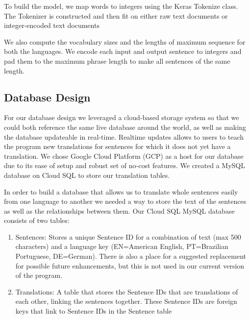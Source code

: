 \documentclass[runningheads]{llncs}
\begin{document}
To build the model, we map words to integers using the Keras Tokenize class. The Tokenizer is constructed and then fit on either raw text documents or integer-encoded text documents
	
	We also compute the vocabulary sizes and the lengths of maximum sequence for both the languages. We encode each input and output sentence to integers and pad them to the maximum phrase length to make all sentences of the same length. 
	
	\subsection{Database Design}
	For our database design we leveraged a cloud-based storage system so that we could both reference the same live database around the world, as well as making the database updateable in real-time. Realtime updates allows to users to teach the program new translations for sentences for which it does not yet have a translation. We chose Google Cloud Platform (GCP) as a host for our database due to its ease of setup and robust set of no-cost features. We created a MySQL database on Cloud SQL to store our translation tables.
	
	In order to build a database that allows us to translate whole sentences easily from one language to another we needed a way to store the text of the sentences as well as the relationships between them. Our Cloud SQL MySQL database consists of two tables:
			
		\begin{enumerate}
			\item Sentences: Stores a unique Sentence ID for a combination of text (max 500 characters) and a language key (EN=American English, PT=Brazilian Portuguese, DE=German). There is also a place for a suggested replacement for possible future enhancements, but this is not used in our current version of the program.
			\item Translations: A table that stores the Sentence IDs that are translations of each other, linking the sentences together. These Sentence IDs are foreign keys that link to Sentence IDs in the Sentence table
		\end{enumerate}
\end{document}
